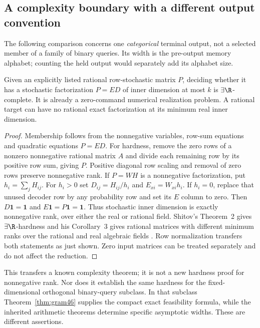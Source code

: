 \subsection{A complexity boundary with a different output convention}
The following comparison concerns one \emph{categorical} terminal
output, not a selected member of a family of binary queries.
Its width is the pre-output memory alphabet; counting the held output
would separately add its alphabet size.

\begin{proposition}\label{prop:hard46}
Given an explicitly listed rational row-stochastic matrix $P$, deciding
whether it has a stochastic factorization $P=ED$ of inner dimension at
most $k$ is $\exists\R$-complete. It is already a zero-command numerical
realization problem. A rational target can have no rational exact factorization at its
minimum real inner dimension.
\end{proposition}
\begin{proof}
Membership follows from the nonnegative variables, row-sum equations
and quadratic equations $P=ED$. For hardness, remove the zero rows of
a nonzero nonnegative rational matrix $A$ and divide each remaining row
by its positive row sum, giving $P$. Positive diagonal row scaling and
removal of zero rows preserve nonnegative rank. If $P=WH$ is a
nonnegative factorization, put $h_i=\sum_jH_{ij}$. For $h_i>0$ set
$D_{ij}=H_{ij}/h_i$ and $E_{xi}=W_{xi}h_i$. If $h_i=0$, replace
that unused decoder row by any probability row and set its $E$ column
to zero. Then $D\mathbf1=\mathbf1$ and
$E\mathbf1=P\mathbf1=\mathbf1$. Thus stochastic inner dimension
is exactly nonnegative rank, over either the real or rational field.
Shitov's Theorem~2 gives $\exists\R$-hardness and his Corollary~3
gives rational matrices with different minimum ranks over the rational
and real algebraic fields \cite{Shitov18}. Row normalization transfers
both statements as just shown. Zero input matrices can be treated
separately and do not affect the reduction.
\end{proof}

This transfers a known complexity theorem; it is not a new hardness
proof for nonnegative rank. Nor does it establish the same hardness for
the fixed-dimensional orthogonal binary-query subclass. In that
subclass Theorem~\ref{thm:gram46} supplies the compact exact feasibility
formula, while the inherited arithmetic theorems determine specific
asymptotic widths. These are different assertions.
